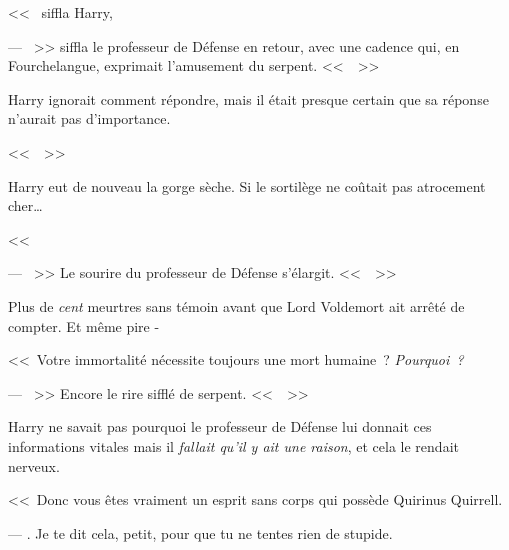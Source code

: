 <<~ siffla Harry, 

--- ~>> siffla le professeur de Défense en retour, avec une cadence qui, en Fourchelangue, exprimait l'amusement du serpent. <<~~>>

Harry ignorait comment répondre, mais il était presque certain que sa réponse n'aurait pas d'importance.

<<~~>>

Harry eut de nouveau la gorge sèche. Si le sortilège ne coûtait pas atrocement cher…

<<~

--- ~>> Le sourire du professeur de Défense s'élargit. <<~~>>

Plus de \emph{cent} meurtres sans témoin avant que Lord Voldemort ait arrêté de compter. Et même pire -

<<~Votre immortalité nécessite toujours une mort humaine~? \emph{Pourquoi~?}

--- ~>> Encore le rire sifflé de serpent. <<~~>>

Harry ne savait pas pourquoi le professeur de Défense lui donnait ces informations vitales mais il \emph{fallait qu'il y ait une raison}, et cela le rendait nerveux.

<<~Donc vous êtes vraiment un esprit sans corps qui possède Quirinus Quirrell.

--- . Je te dit cela, petit, pour que tu ne tentes rien de stupide.

